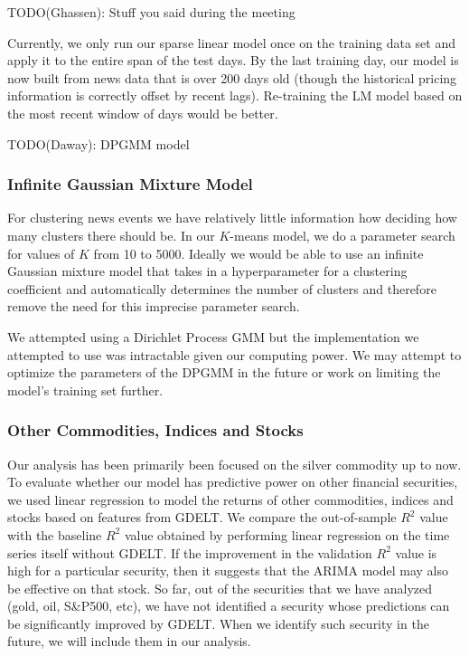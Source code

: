 
TODO(Ghassen): Stuff you said during the meeting

Currently, we only run our sparse linear model once on the training data set and apply it to the entire span of the test days. By the last training day, our model is now built from news data that is over 200 days old (though the historical pricing information is correctly offset by recent lags). Re-training the LM model based on the most recent window of days would be better.

TODO(Daway): DPGMM model
\subsubsection{Infinite Gaussian Mixture Model}
For clustering news events we have relatively little information how deciding how many clusters there should be. In our $K$-means model, we do a parameter search for values of $K$ from 10 to 5000. Ideally we would be able to use an infinite Gaussian mixture model that takes in a hyperparameter for a clustering coefficient and automatically determines the number of clusters and therefore remove the need for this imprecise parameter search. 

We attempted using a Dirichlet Process GMM but the implementation we attempted to use was intractable given our computing power. We may attempt to optimize the parameters of the DPGMM in the future or work on limiting the model's training set further. 

\subsubsection{Other Commodities, Indices and Stocks}
Our analysis has been primarily been focused on the silver commodity up to now. To evaluate whether our model has predictive power on other financial securities, we used linear regression to model the returns of other commodities, indices and stocks based on features from GDELT. We compare the out-of-sample $R^2$ value with the baseline $R^2$ value obtained by performing linear regression on the time series itself without GDELT. If the improvement in the validation $R^2$ value is high for a particular security, then it suggests that the ARIMA model may also be effective on that stock. So far, out of the securities that we have analyzed (gold, oil, S&P500, etc), we have not identified a security whose predictions can be significantly improved by GDELT. When we identify such security in the future, we will include them in our analysis.

